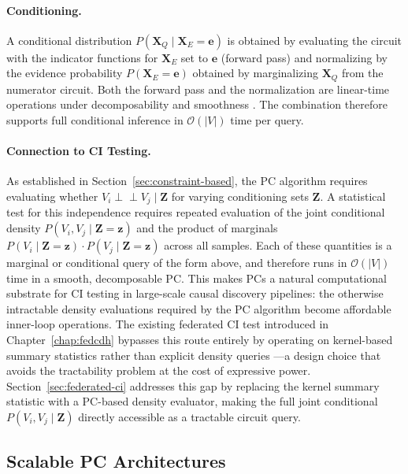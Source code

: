\paragraph{Conditioning.}
A conditional distribution $P(\mathbf{X}_Q \mid \mathbf{X}_E = \mathbf{e})$ is obtained by evaluating the circuit with the indicator functions for $\mathbf{X}_E$ set to $\mathbf{e}$ (forward pass) and normalizing by the evidence probability $P(\mathbf{X}_E = \mathbf{e})$ obtained by marginalizing $\mathbf{X}_Q$ from the numerator circuit.
Both the forward pass and the normalization are linear-time operations under decomposability and smoothness \cite{Darwiche2000ADA, Choi2020ProbabilisticCA}.
The combination therefore supports full conditional inference in $\mathcal{O}(|V|)$ time per query.

\paragraph{Connection to CI Testing.}
As established in Section~\ref{sec:constraint-based}, the PC algorithm requires evaluating whether $V_i \perp\!\!\!\perp V_j \mid \mathbf{Z}$ for varying conditioning sets $\mathbf{Z}$.
A statistical test for this independence requires repeated evaluation of the joint conditional density $P(V_i, V_j \mid \mathbf{Z} = \mathbf{z})$ and the product of marginals $P(V_i \mid \mathbf{Z} = \mathbf{z}) \cdot P(V_j \mid \mathbf{Z} = \mathbf{z})$ across all samples.
Each of these quantities is a marginal or conditional query of the form above, and therefore runs in $\mathcal{O}(|V|)$ time in a smooth, decomposable PC.
This makes PCs a natural computational substrate for CI testing
in large-scale causal discovery pipelines: the otherwise intractable
density evaluations required by the PC algorithm become affordable
inner-loop operations. The existing federated CI test introduced
in Chapter~\ref{chap:fedcdh} bypasses this route entirely by
operating on kernel-based summary statistics rather than explicit
density queries \cite{Li2024FederatedCD}---a design choice that
avoids the tractability problem at the cost of expressive power.
Section~\ref{sec:federated-ci} addresses this gap by replacing
the kernel summary statistic with a PC-based density evaluator,
making the full joint conditional $P(V_i, V_j \mid \mathbf{Z})$
directly accessible as a tractable circuit query.

\subsection*{Scalable PC Architectures}\label{sec:pc-architectures}

